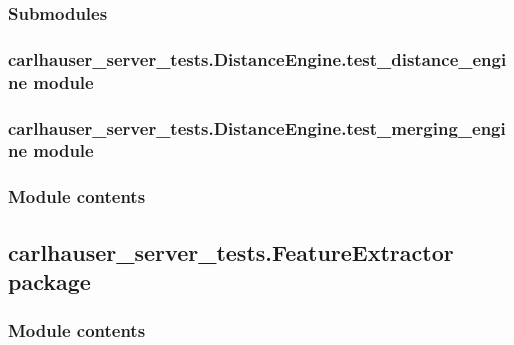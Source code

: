 \documentclass[letterpaper,10pt,english]{sphinxmanual}
\begin{document}
\subsubsection{Submodules}
\label{\detokenize{carlhauser_server_tests.DistanceEngine:submodules}}

\subsubsection{carlhauser\_server\_tests.DistanceEngine.test\_distance\_engine module}
\label{\detokenize{carlhauser_server_tests.DistanceEngine:carlhauser-server-tests-distanceengine-test-distance-engine-module}}

\subsubsection{carlhauser\_server\_tests.DistanceEngine.test\_merging\_engine module}
\label{\detokenize{carlhauser_server_tests.DistanceEngine:carlhauser-server-tests-distanceengine-test-merging-engine-module}}

\subsubsection{Module contents}
\label{\detokenize{carlhauser_server_tests.DistanceEngine:module-carlhauser_server_tests.DistanceEngine}}\label{\detokenize{carlhauser_server_tests.DistanceEngine:module-contents}}

\subsection{carlhauser\_server\_tests.FeatureExtractor package}
\label{\detokenize{carlhauser_server_tests.FeatureExtractor:carlhauser-server-tests-featureextractor-package}}\label{\detokenize{carlhauser_server_tests.FeatureExtractor::doc}}

\subsubsection{Module contents}
\label{\detokenize{carlhauser_server_tests.FeatureExtractor:module-carlhauser_server_tests.FeatureExtractor}}\label{\detokenize{carlhauser_server_tests.FeatureExtractor:module-contents}}
\end{document}
